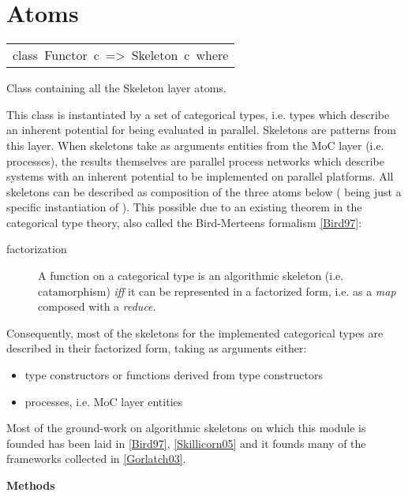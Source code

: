 \section{Atoms}
\begin{haddockdesc}
\item[\begin{tabular}{@{}l}
class\ Functor\ c\ =>\ Skeleton\ c\ where
\end{tabular}]\haddockbegindoc
Class containing all the Skeleton layer atoms.\par
This class is instantiated by a set of categorical types,
 i.e. types which describe an inherent potential for being evaluated
 in parallel. Skeletons are patterns from this layer. When skeletons
 take as arguments entities from the MoC layer (i.e. processes), the
 results themselves are parallel process networks which describe
 systems with an inherent potential to be implemented on parallel
 platforms. All skeletons can be described as composition of the
 three atoms below (\haddockid{=<<=} being just a specific instantiation of
 ). This possible due to an existing theorem in the categorical
 type theory, also called the Bird-Merteens formalism
 \href{ForSyDe-Atom.html#bird97}{[Bird97]}:\par
\par
\begin{description}
\item[factorization] A function on a categorical type is an algorithmic
 skeleton (i.e. catamorphism) \emph{iff} it can be represented in a
 factorized form, i.e. as a \emph{map} composed with a \emph{reduce}.
\end{description}Consequently, most of the skeletons for the implemented categorical
 types are described in their factorized form, taking as arguments
 either:\par
                 \begin{itemize}
                 \item
                 type constructors or functions derived from type constructors\par
                 
                 \item
                 processes, i.e. MoC layer entities\par
                 
                 \end{itemize}
                 Most of the ground-work on algorithmic skeletons on which this
 module is founded has been laid in \href{ForSyDe-Atom.html#bird97}{[Bird97]},
 \href{ForSyDe-Atom.html#skillicorn05}{[Skillicorn05]} and it founds many
 of the frameworks collected in \href{ForSyDe-Atom.html#gorlatch03}{[Gorlatch03]}.\par
                 
\haddockpremethods{}\textbf{Methods}
\end{haddockdesc}
